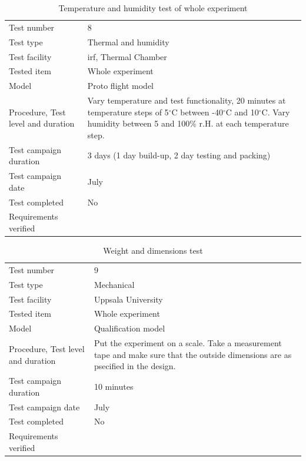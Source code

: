 \documentclass[
  a4paper,
  11pt,
  openany,
  parskip,
  toc=totoc,
  listof=totoc,
  bibliography=totoc
]{scrreprt}
\newcommand{\degree}{\ensuremath{^\circ}} %
\begin{document}
\begin{table}[H]
\centering
\caption{Temperature and humidity test of whole experiment}
\label{tab:test_temperature_humidity}
\begin{tabular}{L{5cm}L{10cm}}
\toprule
Test number & 8 \\
Test type & Thermal and humidity \\
Test facility & \gls{irf}, Thermal Chamber \\
Tested item & Whole experiment \\
Model & Proto flight model \\
Procedure, Test level and duration & Vary temperature and test functionality, 20 minutes at temperature steps of 5\degree C between -40\degree C and 10\degree C. Vary humidity between 5 and 100\% r.H. at each temperature step. \\
Test campaign duration & 3 days (1 day build-up, 2 day testing and packing) \\
Test campaign date & July \\
Test completed & No \\
Requirements verified & \\
\bottomrule
\end{tabular}
\end{table}


\begin{table}[H]
\centering
\caption{Weight and dimensions test}
\label{tab:weight_test}
\begin{tabular}{L{5cm}L{10cm}}
\toprule
Test number & 9 \\
Test type & Mechanical \\
Test facility & Uppsala University \\
Tested item & Whole experiment \\
Model & Qualification model \\
Procedure, Test level and duration & Put the experiment on a scale. Take a measurement tape and make sure that the outside dimensions are as psecified in the design. \\
Test campaign duration & 10 minutes \\
Test campaign date & July \\
Test completed & No \\
Requirements verified & \\
\bottomrule
\end{tabular}
\end{table}
\end{document}
